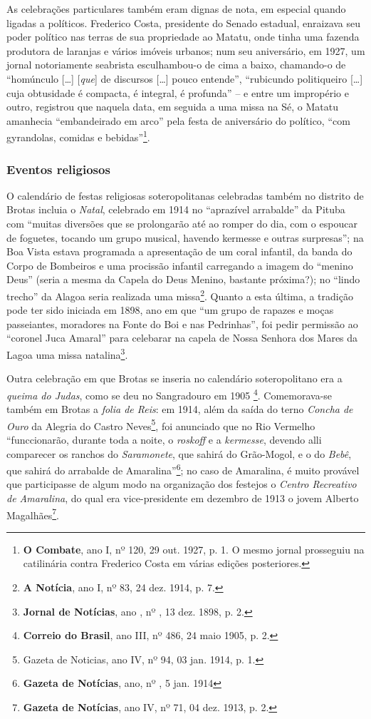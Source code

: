 As celebrações particulares também eram dignas de nota, em especial quando ligadas a políticos. Frederico Costa, presidente do Senado estadual, enraizava seu poder político nas terras de sua propriedade ao Matatu, onde tinha uma fazenda produtora de laranjas e vários imóveis urbanos; num seu aniversário, em 1927, um jornal notoriamente seabrista esculhambou-o de cima a baixo, chamando-o de ``homúnculo [\dots] [\textit{que}] de discursos [\dots] pouco entende'', ``rubicundo politiqueiro [\dots] cuja obtusidade é compacta, é integral, é profunda'' -- e entre um impropério e outro, registrou que naquela data, em seguida a uma missa na Sé, o Matatu amanhecia ``embandeirado em arco'' pela festa de aniversário do político, ``com gyrandolas, comidas e bebidas''\footnote{\textbf{O Combate}, ano I, nº 120, 29 out. 1927, p. 1. O mesmo jornal prosseguiu na catilinária contra Frederico Costa em várias edições posteriores.}.

\subsubsection{Eventos religiosos}

O calendário de festas religiosas soteropolitanas celebradas também no distrito de Brotas incluia o \textit{Natal}, celebrado em 1914 no ``aprazível arrabalde'' da Pituba com ``muitas diversões que se prolongarão até ao romper do dia, com o espoucar de foguetes, tocando um grupo musical, havendo kermesse e outras surpresas''; na Boa Vista estava programada a apresentação de um coral infantil, da banda do Corpo de Bombeiros e uma procissão infantil carregando a imagem do ``menino Deus'' (seria a mesma da Capela do Deus Menino, bastante próxima?); no ``lindo trecho'' da Alagoa seria realizada uma missa\footnote{\textbf{A Notícia}, ano I, nº 83, 24 dez. 1914, p. 7.}. Quanto a esta última, a tradição pode ter sido iniciada em 1898, ano em que ``um grupo de rapazes e moças passeiantes, moradores na Fonte do Boi e nas Pedrinhas'', foi pedir permissão ao ``coronel Juca Amaral'' para celebarar na capela de Nossa Senhora dos Mares da Lagoa uma missa natalina\footnote{\textbf{Jornal de Notícias}, ano , nº , 13 dez. 1898, p. 2.}.

Outra celebração em que Brotas se inseria no calendário soteropolitano era a \textit{queima do Judas}, como se deu no Sangradouro em 1905 \footnote{\textbf{Correio do Brasil}, ano III, nº 486, 24 maio 1905, p. 2.}. Comemorava-se também em Brotas a \textit{folia de Reis}: em 1914, além da saída do terno \textit{Concha de Ouro} da Alegria do Castro Neves\footnote{Gazeta de Noticias, ano IV, nº 94, 03 jan. 1914, p. 1.}, foi anunciado que no Rio Vermelho ``funccionarão, durante toda a noite, o \textit{roskoff} e a \textit{kermesse}, devendo alli comparecer os ranchos do \textit{Saramonete}, que sahirá do Grão-Mogol, e o do \textit{Bebê}, que sahirá do arrabalde de Amaralina''\footnote{\textbf{Gazeta de Notícias}, ano, nº , 5 jan. 1914}; no caso de Amaralina, é muito provável que participasse de algum modo na organização dos festejos o \textit{Centro Recreativo de Amaralina}, do qual era vice-presidente em dezembro de 1913 o jovem Alberto Magalhães\footnote{\textbf{Gazeta de Notícias}, ano IV, nº 71, 04 dez. 1913, p. 2.}.

